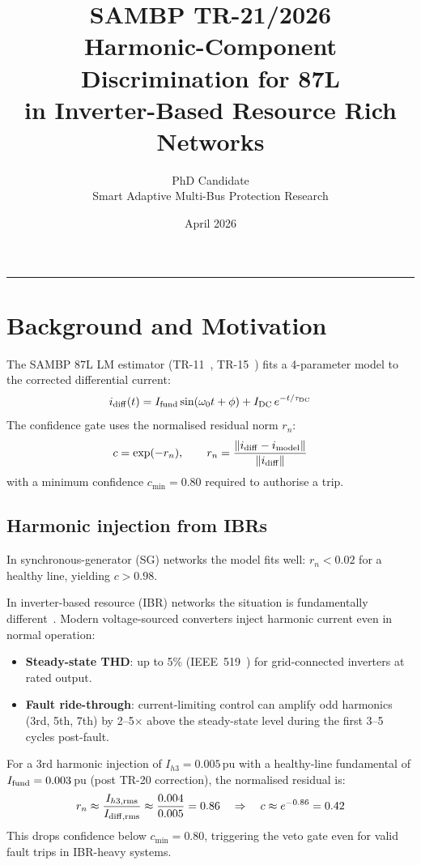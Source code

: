 \documentclass[11pt, a4paper]{article}
\title{\textbf{SAMBP TR-21/2026}\\[4pt]
       \large Harmonic-Component Discrimination for 87L\\
       in Inverter-Based Resource Rich Networks}
\author{PhD Candidate\\[2pt]
        \small Smart Adaptive Multi-Bus Protection Research}
\date{April 2026}
\begin{document}
\maketitle
\tableofcontents
\vspace{6pt}\hrule\vspace{10pt}

\section{Background and Motivation}
\label{sec:background}

The SAMBP 87L LM estimator (TR-11~\cite{SAMBP_TR11}, TR-15~\cite{SAMBP_TR15})
fits a 4-parameter model to the corrected differential current:
\begin{equation}
  i_{\rm diff}(t) = I_{\rm fund}\sin(\omega_0 t + \phi)
                  + I_{\rm DC}\,e^{-t/\tau_{\rm DC}}
\end{equation}
The confidence gate uses the normalised residual norm $r_n$:
\begin{equation}
  c = \exp(-r_n), \qquad
  r_n = \frac{\|i_{\rm diff} - i_{\rm model}\|}{\|i_{\rm diff}\|}
\end{equation}
with a minimum confidence $c_{\min} = 0.80$ required to authorise a trip.

\subsection{Harmonic injection from IBRs}

In synchronous-generator (SG) networks the model fits well: $r_n < 0.02$ for
a healthy line, yielding $c > 0.98$.

In inverter-based resource (IBR) networks the situation is fundamentally
different~\cite{Yazdani2014,Hooshyar2019}.  Modern voltage-sourced converters
inject harmonic current even in normal operation:
\begin{itemize}
  \item \textbf{Steady-state THD}: up to 5\% (IEEE~519~\cite{IEEE_519}) for
        grid-connected inverters at rated output.
  \item \textbf{Fault ride-through}: current-limiting control can amplify
        odd harmonics (3rd, 5th, 7th) by 2--5$\times$ above the steady-state
        level during the first 3--5 cycles post-fault.
\end{itemize}

For a 3rd harmonic injection of $I_{h3} = 0.005$\,pu with a healthy-line
fundamental of $I_{\rm fund} = 0.003$\,pu (post TR-20 correction), the
normalised residual is:
\begin{equation}
  r_n \approx \frac{I_{h3,\rm rms}}{I_{\rm diff,rms}}
           \approx \frac{0.004}{0.005} = 0.86
  \quad \Rightarrow \quad c \approx e^{-0.86} = 0.42
\end{equation}
This drops confidence below $c_{\min}=0.80$, triggering the veto gate even
for valid fault trips in IBR-heavy systems.
\end{document}
